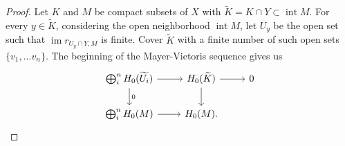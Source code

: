 \documentclass{amsart}
\DeclareMathOperator{\im}{im}
\DeclareMathOperator{\interior}{int}
\begin{document}
	\begin{proof}
		Let $K$ and $M$ be compact subsets of $X$ with $\widetilde K = K \cap Y \subset \interior M$. For every $y \in \widetilde K$, considering the open neighborhood $\interior M$, let $U_y$ be the open set such that $\im r_{U_y \cap Y, M}$ is finite. Cover $\widetilde K$ with a finite number of such open sets $\{v_1, \dots v_n\}$. The beginning of the Mayer-Vietoris sequence gives us
		\begin{equation*}
		\begin{tikzcd}
		\bigoplus_i^n H_0(\widetilde{U_i}) \arrow[r] \arrow[d, "0"] & H_0(\widetilde{K}) \arrow[d] \arrow[r] & 0 \\
		\bigoplus_i^n H_0(M) \arrow[r] & H_0(M). &
		\end{tikzcd}
		\end{equation*}
	\end{proof}
\end{document}
